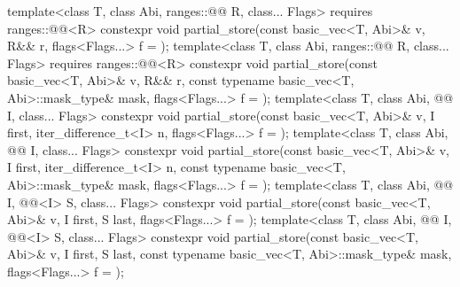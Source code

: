 \begin{itemdecl}
template<class T, class Abi, ranges::@@ R, class... Flags>
  requires ranges::@@<R>
  constexpr void partial_store(const basic_vec<T, Abi>& v, R&& r, flags<Flags...> f = {});
template<class T, class Abi, ranges::@@ R, class... Flags>
  requires ranges::@@<R>
  constexpr void partial_store(const basic_vec<T, Abi>& v, R&& r,
                               const typename basic_vec<T, Abi>::mask_type& mask,
                               flags<Flags...> f = {});
template<class T, class Abi, @@ I, class... Flags>
  constexpr void partial_store(const basic_vec<T, Abi>& v, I first, iter_difference_t<I> n,
                               flags<Flags...> f = {});
template<class T, class Abi, @@ I, class... Flags>
  constexpr void partial_store(const basic_vec<T, Abi>& v, I first, iter_difference_t<I> n,
                               const typename basic_vec<T, Abi>::mask_type& mask,
                               flags<Flags...> f = {});
template<class T, class Abi, @@ I, @@<I> S, class... Flags>
  constexpr void partial_store(const basic_vec<T, Abi>& v, I first, S last,
                               flags<Flags...> f = {});
template<class T, class Abi, @@ I, @@<I> S, class... Flags>
  constexpr void partial_store(const basic_vec<T, Abi>& v, I first, S last,
                               const typename basic_vec<T, Abi>::mask_type& mask,
                               flags<Flags...> f = {});
\end{itemdecl}

